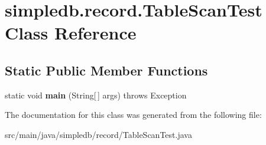 \hypertarget{classsimpledb_1_1record_1_1TableScanTest}{}\section{simpledb.\+record.\+Table\+Scan\+Test Class Reference}
\label{classsimpledb_1_1record_1_1TableScanTest}
\subsection*{Static Public Member Functions}
\begin{DoxyCompactItemize}
\item 
\mbox{\label{classsimpledb_1_1record_1_1TableScanTest_af4733f7408f6464f31f40f950bb88ac1}} 
static void {\bfseries main} (String\mbox{[}$\,$\mbox{]} args)  throws Exception 
\end{DoxyCompactItemize}


The documentation for this class was generated from the following file\+:\begin{DoxyCompactItemize}
\item 
src/main/java/simpledb/record/Table\+Scan\+Test.\+java\end{DoxyCompactItemize}
